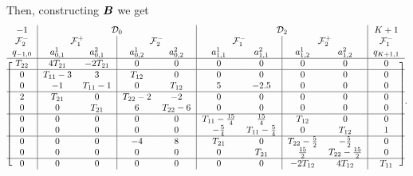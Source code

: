 Then, constructing \({  \boldsymbol B}\) we get 
\[
\begin{blockarray}{c|cc|cc|cc|cc|c}
{-1} & \BAmulticolumn{4}{c|}{\calD_0} & \BAmulticolumn{4}{c|}{\calD_2} & {K+1}\\
\calF_2^- & \BAmulticolumn{2}{c|}{\calF_1^+} & \BAmulticolumn{2}{c|}{\calF_2^-} & \BAmulticolumn{2}{c|}{\calF_1^-} & \BAmulticolumn{2}{c|}{\calF_2^+} & \calF_1^-\\
q_{{-1},0} & a_{0,1}^1 & a_{0,1}^2 & a_{0,2}^1 & a_{0,2}^2 & a_{1,1}^1 & a_{1,1}^2 & a_{1,2}^1 & a_{1,2}^2 & q_{{K+1},1}\\\BAhline
\begin{block}{[c|cc|cc|cc|cc|c]} 
T_{22} & 4T_{21} & -2T_{21} & 0 & 0 & 0 & 0 & 0 & 0 & 0\\\BAhline
0 & T_{11}-3 & 3 & T_{12} & 0 & 0 & 0 & 0 & 0 & 0 \\
0 & -1 & T_{11}-1 & 0 & T_{12} & 5 & -2.5 & 0 & 0 & 0 \\\BAhline 
2 & T_{21} & 0 & T_{22}-2 & -2 & 0 & 0 & 0 & 0 & 0 \\ 
0 & 0 & T_{21} & 6 & T_{22}-6 & 0 & 0 & 0 & 0 & 0\\\BAhline
0 & 0 & 0 & 0 & 0 & T_{11}-\frac{15}{4} & \frac{15}{4} & T_{12} & 0 & 0 \\ 
0 & 0 & 0 & 0 & 0 & -\frac{5}{4} & T_{11}-\frac{5}{4} & 0 & T_{12} &1\\\BAhline
0 & 0 & 0 & -4 & 8 & T_{21} & 0 & T_{22}-\frac{5}{2} & -\frac{5}{2} & 0 \\
0 & 0 & 0 & 0 & 0 & 0 & T_{21} & \frac{15}{2} & T_{22}-\frac{15}{2} & 0 \\\BAhline
0 & 0 & 0 & 0 & 0 & 0 & 0 & -2T_{12} & 4T_{12} & T_{11} \\
\end{block}
\end{blockarray}.
\]

